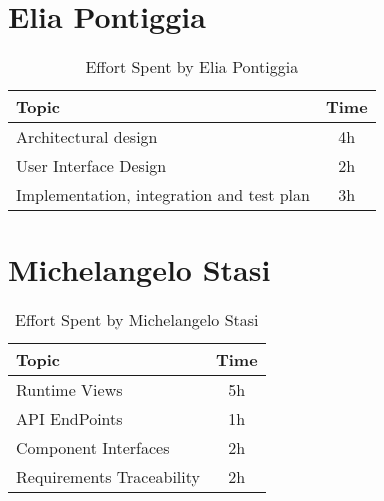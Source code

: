 \section*{Elia Pontiggia}
\begin{table}[H]
    \renewcommand{\arraystretch}{1.5}
    \centering
    \begin{tabular}{|l|c|}
        \hline
        \textbf{Topic}                            & \textbf{Time} \\ \hline
        Architectural design                      & 4h            \\ \hline
        User Interface Design                     & 2h            \\ \hline
        Implementation, integration and test plan & 3h            \\ \hline
    \end{tabular}
    \caption{Effort Spent by Elia Pontiggia}
    \label{tab:pontiggia-effort-spent}
\end{table}

\section*{Michelangelo Stasi}
\begin{table}[H]
    \renewcommand{\arraystretch}{1.5}
    \centering
    \begin{tabular}{|l|c|}
        \hline
        \textbf{Topic} & \textbf{Time} \\ \hline
        Runtime Views  & 5h       \\ \hline
        API EndPoints  & 1h       \\ \hline
        Component Interfaces & 2h  \\ \hline
        Requirements Traceability & 2h \\ \hline
    \end{tabular}
    \caption{Effort Spent by Michelangelo Stasi}
    \label{tab:stasi-effort-spent}
\end{table}
